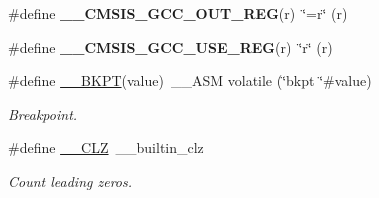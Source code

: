 \begin{DoxyCompactItemize}
\#define {\bfseries \+\_\+\+\_\+\+C\+M\+S\+I\+S\+\_\+\+G\+C\+C\+\_\+\+O\+U\+T\+\_\+\+R\+EG}(r)~\char`\"{}=r\char`\"{} (r)
\item 
\mbox{\label{group___c_m_s_i_s___core___instruction_interface_ga9d94dee7402367961d2cf0accc00fd97}} 
\#define {\bfseries \+\_\+\+\_\+\+C\+M\+S\+I\+S\+\_\+\+G\+C\+C\+\_\+\+U\+S\+E\+\_\+\+R\+EG}(r)~\char`\"{}r\char`\"{} (r)
\item 
\#define \mbox{\hyperlink{group___c_m_s_i_s___core___instruction_interface_ga15ea6bd3c507d3e81c3b3a1258e46397}{\+\_\+\+\_\+\+B\+K\+PT}}(value)~\+\_\+\+\_\+\+A\+SM volatile (\char`\"{}bkpt \char`\"{}\#value)
\begin{DoxyCompactList}\small\item\em Breakpoint. \end{DoxyCompactList}\item 
\#define \mbox{\hyperlink{group___c_m_s_i_s___core___instruction_interface_ga5d5bb1527e042be4a9fa5a33f65cc248}{\+\_\+\+\_\+\+C\+LZ}}~\+\_\+\+\_\+builtin\+\_\+clz
\begin{DoxyCompactList}\small\item\em Count leading zeros. \end{DoxyCompactList}\end{DoxyCompactItemize}

